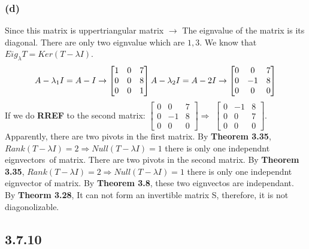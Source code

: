 \documentclass{article}
\begin{document}
\subsubsection*{(d)}
Since this matrix is uppertriangular matrix $\rightarrow$ The eignvalue of the matrix is its diagonal. There are only two eignvalue which are ${1, 3}$.
We know that $Eig _\lambda T = Ker(T - \lambda I)$. 
\begin{equation*}
    A - \lambda_1 I = A - I \rightarrow
    \begin {bmatrix}
    1 & 0 & 7\\
    0 & 0 & 8\\
    0 & 0 & 1
    \end {bmatrix} 
\\\\
    A - \lambda_2 I = A - 2I \rightarrow
    \begin {bmatrix}
    0 & 0 & 7\\
    0 & -1 & 8\\
    0 & 0 & 0
    \end {bmatrix}
\end{equation*}
If we do \textbf{RREF} to the second matrix:
$\begin {bmatrix}
0 & 0 & 7\\
0 & -1 & 8\\
0 & 0 & 0
\end {bmatrix} \Rightarrow$ 
${\begin {bmatrix}
0 & -1 & 8\\
0 & 0 & 7\\
0 & 0 & 0
\end {bmatrix}}$.
Apparently, there are two pivots in the first matrix. By \textbf{Theorem 3.35}, $Rank(T - \lambda I) = 2 \Rightarrow Null(T - \lambda I) = 1$ there is only one independnt eignvectors\ of
matrix. There are two pivots in the second matrix. By \textbf{Theorem 3.35}, $Rank(T - \lambda I) = 2 \Rightarrow Null(T - \lambda I) = 1$ there is only one independnt eignvector of
matrix. By \textbf{Theorem 3.8}, these two eignvectos are independant. By \textbf{Theorm 3.28}, It can not form an invertible matrix S, therefore, it is not diagonolizable.


\subsection*{3.7.10}
\end{document}
